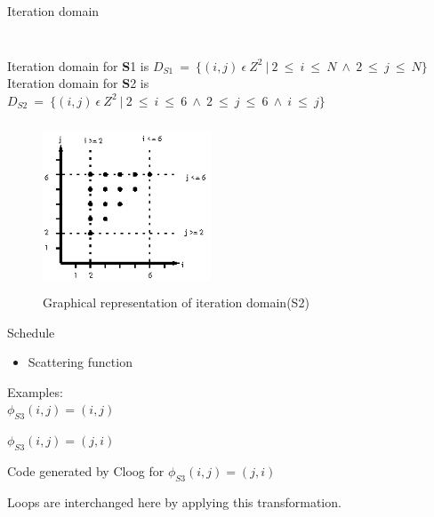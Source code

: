 \documentclass{beamer}
\begin{document}
\begin{frame}[shrink]{Iteration domain}
\begin{columns}[t]
	\begin{block}{ }
	{\tiny}
	\end{block}
	
	\begin{block}{ }
	{\tiny}
	\end{block}
	\end{columns}
\pause
Iteration domain for {\textbf S1} is 
$D_{S1}\ =\ \{(i,j)\ \epsilon\ Z^2\ |\ 2\ \leq\ i\ \leq\ N\ \wedge\ 2\ \leq\ j\ \leq\ N\}$
\linebreak\linebreak
Iteration domain for {\textbf S2} is 
$D_{S2}\ =\ \{(i,j)\ \epsilon\ Z^2\ |\ 2\ \leq\ i\ \leq\ 6\ \wedge\ 2\ \leq\ j\ \leq\ 6\ \wedge\ i\ \leq\ j\}$
\pause
\begin{figure}
\begin{center}
  \includegraphics[height=5cm,width=5cm]{images/iter1.eps}
  \caption{Graphical representation of iteration domain(S2)}
  \label{fig:iter1}
\end{center}  
\end{figure}
\end{frame}

\begin{frame}{Schedule}
\begin{itemize}
\item Scattering function
\end{itemize}

\pause

\begin{block}{ }
{\tiny}
\end{block}
Examples: \\
$\phi_{S3}(i,j) = (i,j)$

$\phi_{S3}(i,j) = (j,i)$

\pause

\begin{block}{Code generated by Cloog for $\phi_{S3}(i,j) = (j,i)$}
{\tiny}
\end{block}


Loops are interchanged here by applying this transformation.
\end{frame}
\end{document}
